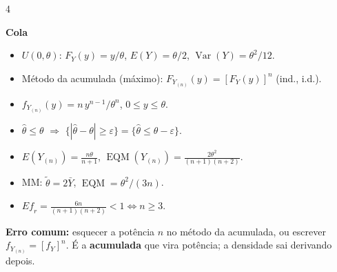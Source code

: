 \documentclass[8pt]{extarticle}
\newcommand{\Var}{\operatorname{Var}}
\newcommand{\EQM}{\operatorname{EQM}}
\newcommand{\Efr}{\mathit{Ef}_r}
\newcommand{\erro}[1]{\par{\scriptsize\textbf{Erro comum:} #1}\par}
\newenvironment{cola}{\par\vspace{2pt}\noindent\textbf{Cola}\begin{itemize}[leftmargin=*,nosep,label=\textbullet]\scriptsize}{\end{itemize}}
\begin{document}
\begin{multicols*}{4}
\begin{cola}
\item $U(0,\theta)$: $F_Y(y)=y/\theta$, $E(Y)=\theta/2$, $\Var(Y)=\theta^2/12$.
\item Método da acumulada (máximo): $F_{Y_{(n)}}(y)=[F_Y(y)]^n$ (ind., i.d.).
\item $f_{Y_{(n)}}(y)=n\,y^{n-1}/\theta^n$, $0\le y\le\theta$.
\item $\hat\theta\le\theta$ $\Rightarrow$ $\{|\hat\theta-\theta|\ge\varepsilon\}=\{\hat\theta\le\theta-\varepsilon\}$.
\item $E(Y_{(n)})=\frac{n\theta}{n+1}$, $\EQM(Y_{(n)})=\frac{2\theta^2}{(n+1)(n+2)}$.
\item MM: $\tilde\theta=2\bar Y$, $\EQM=\theta^2/(3n)$.
\item $\Efr=\frac{6n}{(n+1)(n+2)}<1\iff n\ge3$.
\end{cola}
\erro{esquecer a potência $n$ no método da acumulada, ou escrever $f_{Y_{(n)}}=[f_Y]^n$. É a \textbf{acumulada} que vira potência; a densidade sai derivando depois.}


\end{multicols*}
\end{document}
